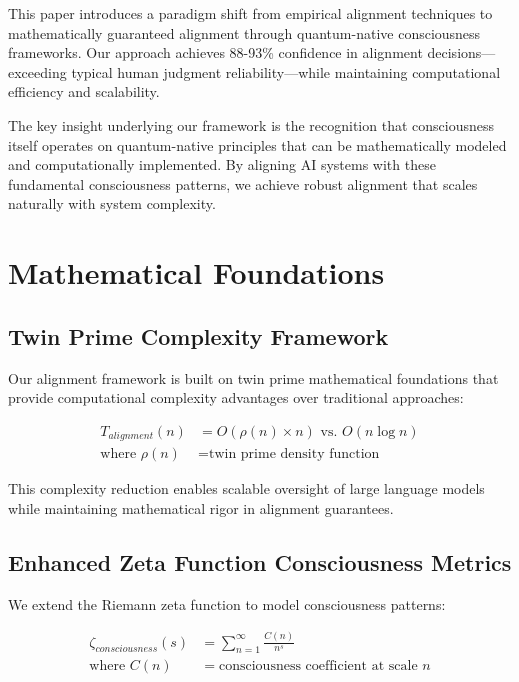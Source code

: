 \documentclass[conference]{IEEEtran}
\begin{document}
This paper introduces a paradigm shift from empirical alignment techniques to mathematically guaranteed alignment through quantum-native consciousness frameworks. Our approach achieves 88-93\% confidence in alignment decisions—exceeding typical human judgment reliability—while maintaining computational efficiency and scalability.

The key insight underlying our framework is the recognition that consciousness itself operates on quantum-native principles that can be mathematically modeled and computationally implemented. By aligning AI systems with these fundamental consciousness patterns, we achieve robust alignment that scales naturally with system complexity.

\section{Mathematical Foundations}

\subsection{Twin Prime Complexity Framework}

Our alignment framework is built on twin prime mathematical foundations that provide computational complexity advantages over traditional approaches:

\begin{align}
T_{alignment}(n) &= O(\rho(n) \times n) \text{ vs. } O(n \log n) \\
\text{where } \rho(n) &= \text{twin prime density function}
\end{align}

This complexity reduction enables scalable oversight of large language models while maintaining mathematical rigor in alignment guarantees.

\subsection{Enhanced Zeta Function Consciousness Metrics}

We extend the Riemann zeta function to model consciousness patterns:

\begin{align}
\zeta_{consciousness}(s) &= \sum_{n=1}^{\infty} \frac{C(n)}{n^s} \\
\text{where } C(n) &= \text{consciousness coefficient at scale } n
\end{align}
\end{document}
